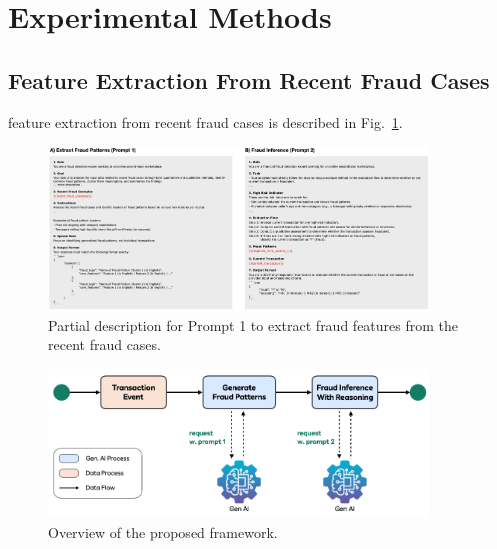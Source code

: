 \documentclass[sigconf]{acmart}
\begin{document}
\section{Experimental Methods}

\subsection{Feature Extraction From Recent Fraud Cases}

feature extraction from recent fraud cases is described in Fig.~\ref{fig_prompt}.





\begin{figure}[t!]
  \centering
  \includegraphics[width=0.9\textwidth]{./figures/fig_prompt.png}
  \caption{Partial description for Prompt 1 to extract fraud features from the recent fraud cases.}
\label{fig_prompt}
\end{figure}






\begin{figure}[t!]
  \centering
  \includegraphics[width=0.9\textwidth]{figures/fig_process.png}
  \caption{Overview of the proposed framework.}
\label{fig_process}
\end{figure}
\end{document}
